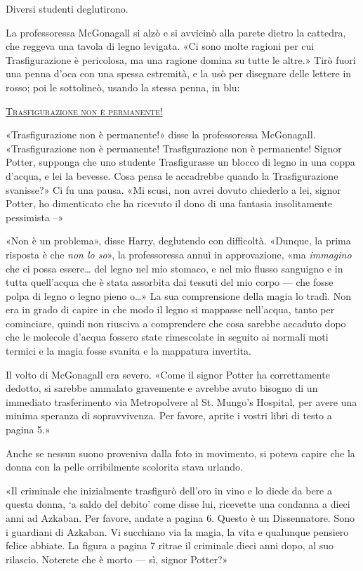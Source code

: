 Diversi studenti deglutirono.

La professoressa McGonagall si alzò e si avvicinò alla parete dietro la cattedra, che reggeva una tavola di legno levigata. «Ci sono molte ragioni per cui Trasfigurazione è pericolosa, ma una ragione domina su tutte le altre.» Tirò fuori una penna d’oca con una spessa estremità, e la usò per disegnare delle lettere in rosso; poi le sottolineò, usando la stessa penna, in blu:

\begin{center}
\underline{\textsc{Trasfigurazione non è permanente!}}
\end{center}

«Trasfigurazione non è permanente!» disse la professoressa McGonagall. «Trasfigurazione non è permanente! Trasfigurazione non è permanente! Signor Potter, supponga che uno studente Trasfigurasse un blocco di legno in una coppa d’acqua, e lei la bevesse. Cosa pensa le accadrebbe quando la Trasfigurazione svanisse?» Ci fu una pausa. «Mi scusi, non avrei dovuto chiederlo a lei, signor Potter, ho dimenticato che ha ricevuto il dono di una fantasia insolitamente pessimista –»

«Non è un problema», disse Harry, deglutendo con difficoltà. «Dunque, la prima risposta è che \textit{non lo so}», la professoressa annuì in approvazione, «ma \textit{immagino} che ci possa essere… del legno nel mio stomaco, e nel mio flusso sanguigno e in tutta quell’acqua che è stata assorbita dai tessuti del mio corpo — che fosse polpa di legno o legno pieno o…» La sua comprensione della magia lo tradì. Non era in grado di capire in che modo il legno si mappasse nell’acqua, tanto per cominciare, quindi non riusciva a comprendere che cosa sarebbe accaduto dopo che le molecole d’acqua fossero state rimescolate in seguito ai normali moti termici e la magia fosse svanita e la mappatura invertita.

Il volto di McGonagall era severo. «Come il signor Potter ha correttamente dedotto, si sarebbe ammalato gravemente e avrebbe avuto bisogno di un immediato trasferimento via Metropolvere al St. Mungo’s Hospital, per avere una minima speranza di sopravvivenza. Per favore, aprite i vostri libri di testo a pagina 5.»

Anche se nessun suono proveniva dalla foto in movimento, si poteva capire che la donna con la pelle orribilmente scolorita stava urlando.

«Il criminale che inizialmente trasfigurò dell’oro in vino e lo diede da bere a questa donna, ‘a saldo del debito’ come disse lui, ricevette una condanna a dieci anni ad Azkaban. Per favore, andate a pagina 6. Questo è un Dissennatore. Sono i guardiani di Azkaban. Vi succhiano via la magia, la vita e qualunque pensiero felice abbiate. La figura a pagina 7 ritrae il criminale dieci anni dopo, al suo rilascio. Noterete che è morto — sì, signor Potter?»

